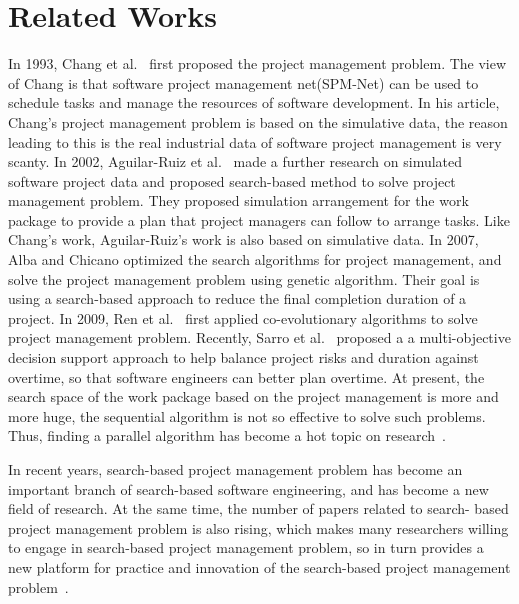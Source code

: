 
\section{Related Works}
%
In 1993, Chang et al.~\cite{chang} first proposed the project management problem. The view of 
Chang is that software project management net(SPM-Net) can be used to 
schedule tasks and manage the resources of software development. 
In his article, Chang's project management problem is based on the simulative 
data, the reason leading to this is the real industrial data of software 
project management is very scanty. In 2002, Aguilar-Ruiz et al.~\cite{alba} made a 
further research on simulated software project data and proposed search-based 
method to solve project management problem. They proposed 
simulation arrangement for the work package to provide a plan that project 
managers can follow to arrange tasks. Like Chang's work, Aguilar-Ruiz's work 
is also based on simulative data. In 2007, Alba and Chicano optimized the 
search algorithms for project management, and solve the project management 
problem using genetic algorithm. Their goal is using a search-based approach 
to reduce the final completion duration of a project. In 2009, Ren et al.~\cite{ren} first 
applied co-evolutionary algorithms to solve project management problem. 
Recently, Sarro et al.~\cite{sarro} proposed a a multi-objective decision support approach to help
balance project risks and duration against overtime, so that software
engineers can better plan overtime. 
At present, the search space of the work package based on the project 
management is more and more huge, the sequential algorithm is not so 
effective to solve such problems. Thus, finding a parallel algorithm has 
become a hot topic on research~\cite{pentico}.


In recent years, search-based project management problem has become an 
important branch of search-based software engineering, and has become a new 
field of research. At the same time, the number of papers related to search-
based project management problem is also rising, which makes many researchers 
willing to engage in search-based project management problem, so in turn 
provides a new platform for practice and innovation of the search-based 
project management problem~\cite{penta}.


